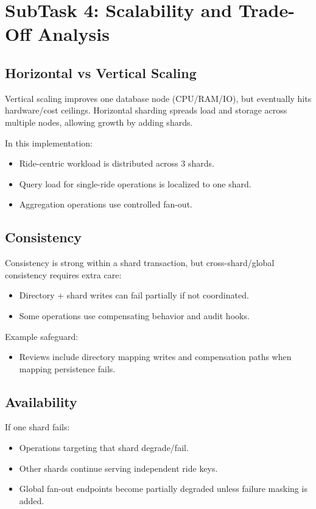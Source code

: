 \documentclass[12pt]{article}
\begin{document}
\section{SubTask 4: Scalability and Trade-Off Analysis}

\subsection{Horizontal vs Vertical Scaling}

Vertical scaling improves one database node (CPU/RAM/IO), but eventually hits hardware/cost ceilings.
Horizontal sharding spreads load and storage across multiple nodes, allowing growth by adding shards.

In this implementation:
\begin{itemize}
    \item Ride-centric workload is distributed across 3 shards.
    \item Query load for single-ride operations is localized to one shard.
    \item Aggregation operations use controlled fan-out.
\end{itemize}

\subsection{Consistency}

Consistency is strong within a shard transaction, but cross-shard/global consistency requires extra care:
\begin{itemize}
    \item Directory + shard writes can fail partially if not coordinated.
    \item Some operations use compensating behavior and audit hooks.
\end{itemize}

Example safeguard:
\begin{itemize}
    \item Reviews include directory mapping writes and compensation paths when mapping persistence fails.
\end{itemize}

\subsection{Availability}

If one shard fails:
\begin{itemize}
    \item Operations targeting that shard degrade/fail.
    \item Other shards continue serving independent ride keys.
    \item Global fan-out endpoints become partially degraded unless failure masking is added.
\end{itemize}
\end{document}
